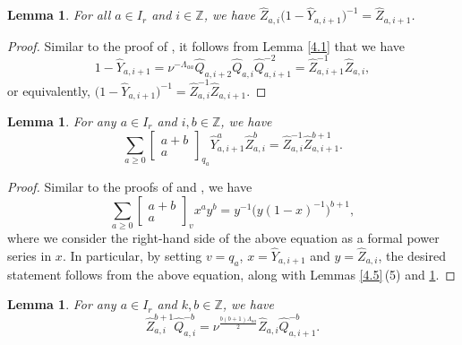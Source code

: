 \documentclass[10pt,a4paper]{amsart}
\numberwithin{equation}{section}
\newtheorem{Lemma}[Theorem]{Lemma}
\begin{document}
\begin{Lemma}\label{4.6}
For all $a\in I_r$ and $i\in\mathbb{Z}$, we have $\widehat{Z}_{a,i}\bigl(1-\widehat{Y}_{a,i+1}\bigr)^{-1} =\widehat{Z}_{a,i+1}$.
\end{Lemma}

\begin{proof}
Similar to the proof of \cite[Lemma 4.5]{Lin21}, it follows from Lemma \ref{4.1} that we have
\begin{equation*}
1-\widehat{Y}_{a,i+1}
=\nu^{-\Lambda_{aa}}\widehat{Q}_{a, i+2}\widehat{Q}_{a,i}\widehat{Q}_{a,i+1}^{-2}
=\widehat{Z}_{a,i+1}^{-1}\widehat{Z}_{a,i},
\end{equation*}
or equivalently, $\bigl(1-\widehat{Y}_{a,i+1}\bigr)^{-1}= \widehat{Z}_{a,i}^{-1}\widehat{Z}_{a,i+1}$.
\end{proof}

\begin{Lemma}\label{4.7}
For any $a\in I_r$ and $i,b\in\mathbb{Z}$, we have
\begin{equation*}
\sum_{a\geq0}\begin{bmatrix}a+b\\a\end{bmatrix}_{q_a}\widehat{Y}_{a,i+1}^a\widehat{Z}_{a,i}^b=\widehat{Z}_{a,i}^{-1}\widehat{Z}_{a,i+1}^{b+1}.
\end{equation*}
\end{Lemma}

\begin{proof}
Similar to the proofs of \cite[Lemma 4.7]{DFK14} and \cite[Lemma 4.6]{Lin21}, we have
\begin{equation*}
\sum_{a\geq0}\begin{bmatrix}a+b\\a\end{bmatrix}_vx^ay^b=y^{-1}\bigl(y(1-x)^{-1}\bigr)^{b+1},
\end{equation*}
where we consider the right-hand side of the above equation as a formal power series in $x$. In particular, by setting $v=q_a$, $x=\widehat{Y}_{a,i+1}$ and $y=\widehat{Z}_{a,i}$, the desired statement follows from the above equation, along with Lemmas \ref{4.5}\,(5) and \ref{4.6}.
\end{proof}

\begin{Lemma}\label{4.8}
For any $a\in I_r$ and $k,b\in\mathbb{Z}$, we have
\begin{equation*}
\widehat{Z}_{a,i}^{b+1}\widehat{Q}_{a,i}^{-b}
=\nu^{\frac{b(b+1)\Lambda_{aa}}{2}}\widehat{Z}_{a,i}\widehat{Q}_{a,i+1}^{-b}.
\end{equation*}
\end{Lemma}
\end{document}
